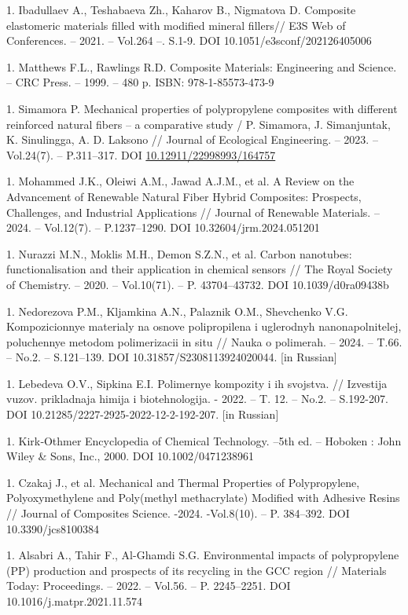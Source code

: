 1. Ibadullaev A., Teshabaeva Zh., Kaharov B., Nigmatova D. Composite
elastomeric materials filled with modified mineral fillers// E3S Web
of Conferences. -- 2021. -- Vol.264 --. S.1-9. DOI
10.1051/e3sconf/202126405006

1. Matthews F.L., Rawlings R.D. Composite Materials: Engineering and
Science. -- CRC Press. -- 1999. -- 480 p. ISBN: 978-1-85573-473-9

1. Simamora P. Mechanical properties of polypropylene composites with
different reinforced natural fibers -- a comparative study / P.
Simamora, J. Simanjuntak, K. Sinulingga, A. D. Laksono // Journal of
Ecological Engineering. -- 2023. -- Vol.24(7). -- P.311--317. DOI
\href{https://doi.org/10.12911/22998993/164757}{10.12911/22998993/164757}

1. Mohammed J.K., Oleiwi A.M., Jawad A.J.M., et al. A Review on the
Advancement of Renewable Natural Fiber Hybrid Composites: Prospects,
Challenges, and Industrial Applications // Journal of Renewable
Materials. -- 2024. -- Vol.12(7). -- P.1237--1290. DOI
10.32604/jrm.2024.051201

1. Nurazzi M.N., Moklis M.H., Demon S.Z.N., et al. Carbon nanotubes:
functionalisation and their application in chemical sensors // The
Royal Society of Chemistry. -- 2020. -- Vol.10(71). -- P.
43704--43732. DOI 10.1039/d0ra09438b

1. Nedorezova P.M., Kljamkina A.N., Palaznik O.M., Shevchenko V.G.
Kompozicionnye materialy na osnove polipropilena i uglerodnyh
nanonapolnitelej, poluchennye metodom polimerizacii in situ // Nauka o
polimerah. -- 2024. -- T.66. -- No.2. -- S.121--139. DOI
10.31857/S2308113924020044. {[}in Russian{]}

1. Lebedeva O.V., Sipkina E.I. Polimernye kompozity i ih svojstva. //
Izvestija vuzov. prikladnaja himija i biotehnologija. - 2022. -- T.
12. -- No.2. -- S.192-207. DOI 10.21285/2227-2925-2022-12-2-192-207.
{[}in Russian{]}

1. Kirk‐Othmer Encyclopedia of Chemical Technology. --5th ed. -- Hoboken
: John Wiley \& Sons, Inc., 2000. DOI 10.1002/0471238961

1. Czakaj J., et al. Mechanical and Thermal Properties of Polypropylene,
Polyoxymethylene and Poly(methyl methacrylate) Modified with Adhesive
Resins // Journal of Composites Science. -2024. -Vol.8(10). -- P.
384--392. DOI 10.3390/jcs8100384

1. Alsabri A., Tahir F., Al-Ghamdi S.G. Environmental impacts of
polypropylene (PP) production and prospects of its recycling in the
GCC region // Materials Today: Proceedings. -- 2022. -- Vol.56. -- P.
2245--2251. DOI 10.1016/j.matpr.2021.11.574

